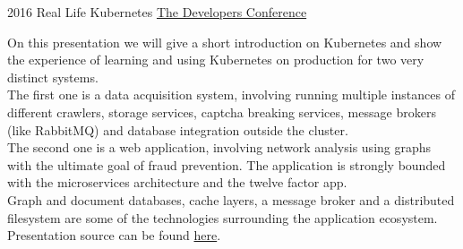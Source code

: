 \documentclass[]{friggeri-cv} %
\begin{document}
\begin{entrylist}
\entry
{2016}
{Real Life Kubernetes}
{\href{http://www.thedevelopersconference.com.br/tdc/2016/florianopolis/trilha-devops}{The Developers Conference}}
{

On this presentation we will give a short introduction on Kubernetes and show the experience of learning
and using Kubernetes on production for two very distinct systems.\\

The first one is a data acquisition system, involving running multiple instances of different crawlers,
storage services, captcha breaking services, message brokers (like RabbitMQ) and database integration outside the cluster.\\

The second one is a web application, involving network analysis using graphs with the ultimate goal of fraud prevention.
The application is strongly bounded with the microservices architecture and the twelve factor app.\\

Graph and document databases, cache layers, a message broker and a distributed filesystem are some of
the technologies surrounding the application ecosystem.\\

Presentation source can be found \href{https://github.com/katcipis/my.presentations/tree/master/real-life-kubernetes}{here}.

}
\end{entrylist}
\end{document}
